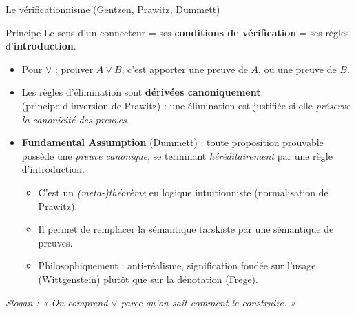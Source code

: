 \documentclass[aspectratio=169]{beamer}
\begin{document}
\begin{frame}{Le vérificationnisme (Gentzen, Prawitz, Dummett)}
  \begin{block}{Principe}
    Le sens d'un connecteur = ses \textbf{conditions de vérification} = ses règles d'\textbf{introduction}.
  \end{block}
  \begin{itemize}
    \item Pour $\vee$ : prouver $A \vee B$, c'est apporter une preuve de $A$, ou une preuve de $B$.
      \pause
    \item Les règles d'élimination sont \textbf{dérivées canoniquement} \\
      (principe d'inversion de Prawitz) : une élimination est justifiée si elle
      \emph{préserve la canonicité des preuves}.
      \pause
    \item \textbf{Fundamental Assumption} (Dummett) : toute proposition prouvable possède
      une \emph{preuve canonique}, se terminant \emph{héréditairement} par une règle d'introduction.
      \begin{itemize}
        \item C'est un \emph{(meta-)théorème} en logique intuitionniste (normalisation de Prawitz).
        \item Il permet de remplacer la sémantique tarskiste par une sémantique de preuves.
        \item Philosophiquement : anti-réalisme, signification fondée sur l'usage \\
          (Wittgenstein) plutôt que sur la dénotation (Frege).
      \end{itemize}
  \end{itemize}
  \medskip
  \textit{Slogan : « On comprend $\vee$ parce qu'on sait comment le construire. »}
\end{frame}
\end{document}
